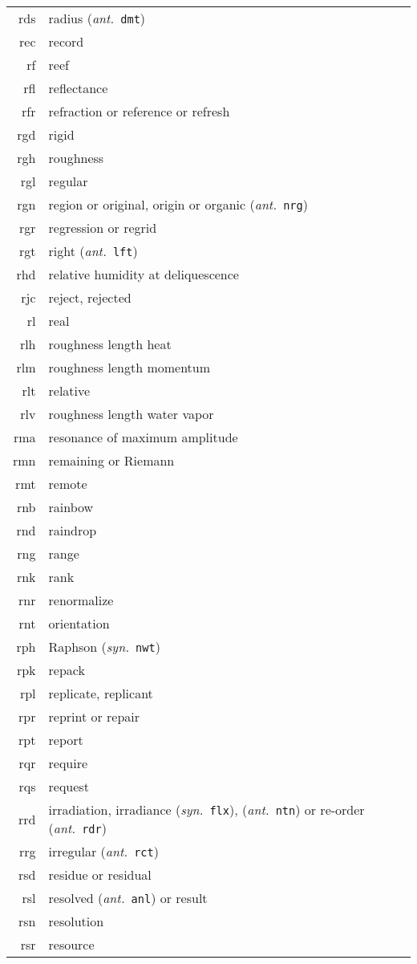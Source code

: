 \documentclass[12pt,twoside]{article}
\newcommand{\ant}[1]{(\textit{ant.}~\texttt{#1})}
\newcommand{\syn}[1]{(\textit{syn.}~\texttt{#1})}
\begin{document}
\begin{longtable}[>{\bfseries}l]{>{\ttfamily}r l}
rds & radius \ant{dmt} \\
rec & record \\
rf & reef \\
rfl & reflectance \\
rfr & refraction or reference or refresh \\
rgd & rigid \\
rgh & roughness \\
rgl & regular \\
rgn & region or original, origin or organic \ant{nrg} \\
rgr & regression or regrid \\
rgt & right \ant{lft} \\
rhd & relative humidity at deliquescence \\
rjc & reject, rejected \\
rl & real \\
rlh & roughness length heat \\
rlm & roughness length momentum \\
rlt & relative \\
rlv & roughness length water vapor \\
rma & resonance of maximum amplitude \\
rmn & remaining or Riemann \\
rmt & remote \\
rnb & rainbow \\
rnd & raindrop \\
rng & range \\
rnk & rank \\
rnr & renormalize \\
rnt & orientation \\
rph & Raphson \syn{nwt} \\
rpk & repack \\
rpl & replicate, replicant \\
rpr & reprint or repair \\
rpt & report \\
rqr & require \\
rqs & request \\
rrd & irradiation, irradiance \syn{flx}, \ant{ntn} or re-order \ant{rdr} \\
rrg & irregular \ant{rct} \\
rsd & residue or residual \\
rsl & resolved \ant{anl} or result \\
rsn & resolution \\
rsr & resource \\

\end{longtable}
\end{document}
